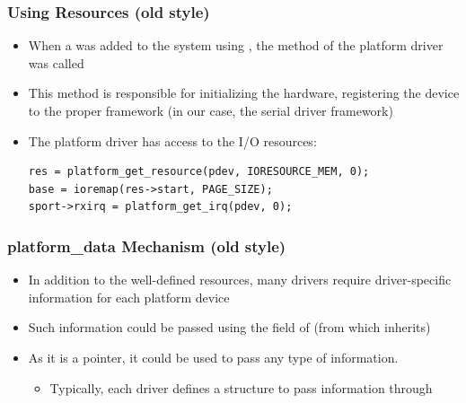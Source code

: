 \begin{frame}[fragile]
  \frametitle{Using Resources (old style)}
  \begin{itemize}
  \item When a  was added to the system using
    , the  method of the
    platform driver was called
  \item This method is responsible for initializing the hardware,
    registering the device to the proper framework (in our case, the
    serial driver framework)
  \item The platform driver has access to the I/O resources:
    \begin{block}{}
  \begin{verbatim}
res = platform_get_resource(pdev, IORESOURCE_MEM, 0);
base = ioremap(res->start, PAGE_SIZE);
sport->rxirq = platform_get_irq(pdev, 0);
  \end{verbatim}
  \end{block}
  \end{itemize}
\end{frame}

\begin{frame}
  \frametitle{platform\_data Mechanism (old style)}
  \begin{itemize}
  \item In addition to the well-defined resources, many drivers
    require driver-specific information for each platform device
  \item Such information could be passed using the 
    field of  (from which
     inherits)
  \item As it is a  pointer, it could be used to pass any
    type of information.
    \begin{itemize}
    \item Typically, each driver defines a structure to pass
      information through 
    \end{itemize}
  \end{itemize}
\end{frame}

